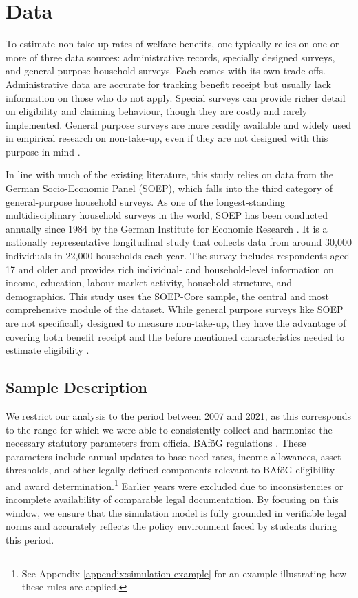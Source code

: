 %
%




\section{Data}
To estimate non-take-up rates of welfare benefits, one typically relies on one or more of three data sources: administrative records, specially designed surveys, and general purpose household surveys.
Each comes with its own trade-offs. 
Administrative data are accurate for tracking benefit receipt but usually lack information on those who do not apply. 
Special surveys can provide richer detail on eligibility and claiming behaviour, though they are costly and rarely implemented. 
General purpose surveys are more readily available and widely used in empirical research on non-take-up, even if they are not designed with this purpose in mind \citep{mechelen_who_2017}.

In line with much of the existing literature, this study relies on data from the German Socio-Economic Panel (SOEP), which falls into the third category of general-purpose household surveys. 
As one of the longest-standing multidisciplinary household surveys in the world, SOEP has been conducted annually since 1984 by the German Institute for Economic Research \citep{soepcore_v39}. 
It is a nationally representative longitudinal study that collects data from around 30,000 individuals in 22,000 households each year. 
The survey includes respondents aged 17 and older and provides rich individual- and household-level information on income, education, labour market activity, household structure, and demographics. 
This study uses the SOEP-Core sample, the central and most comprehensive module of the dataset. While general purpose surveys like SOEP are not specifically designed to measure non-take-up, they have the advantage of covering both benefit receipt and the before mentioned characteristics needed to estimate eligibility \citep{mechelen_who_2017}.

\subsection{Sample Description}
We restrict our analysis to the period between 2007 and 2021, as this corresponds to the range for which we were able to consistently collect and harmonize the necessary statutory parameters from official BAföG regulations \citep{bafoeg_law}. These parameters include annual updates to base need rates, income allowances, asset thresholds, and other legally defined components relevant to BAföG eligibility and award determination.\footnote{
  See Appendix \ref{appendix:simulation-example} for an example illustrating how these rules are applied.
}
Earlier years were excluded due to inconsistencies or incomplete availability of comparable legal documentation. By focusing on this window, we ensure that the simulation model is fully grounded in verifiable legal norms and accurately reflects the policy environment faced by students during this period.

